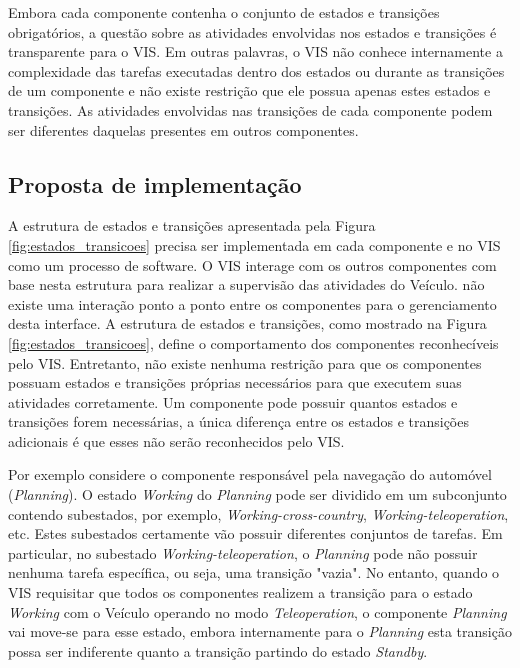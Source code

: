 \documentclass[conference]{IEEEtran}
\begin{document}
Embora cada componente contenha o conjunto de estados e transições obrigatórios, a questão sobre as atividades envolvidas nos estados e transições é transparente para o VIS. Em outras palavras, o VIS não conhece internamente a complexidade das tarefas executadas dentro dos estados ou durante as transições de um componente e não existe restrição que ele possua apenas estes estados e transições. As atividades envolvidas nas transições de cada componente podem ser diferentes daquelas presentes em outros componentes.

\subsection{Proposta de implementação}\label{subsec:proposal_implementation}

A estrutura de estados e transições apresentada pela Figura \ref{fig:estados_transicoes} precisa ser implementada em cada componente e no VIS como um processo de software. O VIS interage com os outros componentes com base nesta estrutura para realizar a supervisão das atividades do Veículo. não existe uma interação ponto a ponto entre os componentes para o gerenciamento desta interface. A estrutura de estados e transições, como mostrado na Figura \ref{fig:estados_transicoes}, define o comportamento dos componentes reconhecíveis pelo VIS. Entretanto, não existe nenhuma restrição para que os componentes possuam estados e transições próprias necessários para que executem suas atividades corretamente. Um componente pode possuir quantos estados e transições forem necessárias, a única diferença entre os estados e transições adicionais é que esses não serão reconhecidos pelo VIS.

Por exemplo considere o componente responsável pela navegação do automóvel (\textit{Planning}). O estado \textit{Working} do \textit{Planning} pode ser dividido em um subconjunto contendo subestados, por exemplo, \textit{Working-cross-country}, \textit{Working-teleoperation}, etc. Estes subestados certamente vão possuir diferentes conjuntos de tarefas. Em particular, no subestado \textit{Working-teleoperation}, o \textit{Planning} pode não possuir nenhuma tarefa específica, ou seja, uma transição "vazia". No entanto, quando o VIS requisitar que todos os componentes realizem a transição para o estado \textit{Working} com o Veículo operando no modo \textit{Teleoperation}, o componente \textit{Planning} vai move-se para esse estado, embora internamente para o \textit{Planning} esta transição possa ser indiferente quanto a transição partindo do estado \textit{Standby}.
\end{document}
